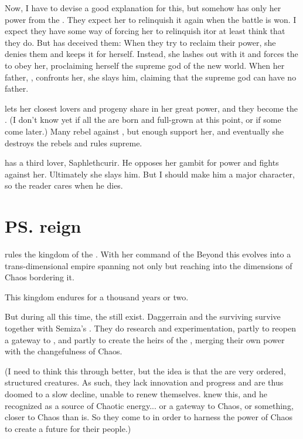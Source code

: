 Now, I have to devise a good explanation for this, but somehow \Xserasshana{} has only  her power from the \dragons{}. They expect her to relinquish it again when the battle is won. I expect they have some way of forcing her to relinquish it\dash or at least think that they do. But \Xserasshana{} has deceived them: When they try to reclaim their power, she denies them and keeps it for herself. Instead, she lashes out with it and forces the \dragons{} to obey her, proclaiming herself the supreme god of the new world. When her father, \HesodN, confronts her, she slays him, claiming that the supreme god can have no father. 

\Xserasshana{} lets her closest lovers and progeny share in her great power, and they become the \Dominators. (I don't know yet if all the \Dominators{} are born and full-grown at this point, or if some come later.) 
Many \dragons{} rebel against \Xserasshana{}, but enough support her, and eventually she destroys the rebels and rules supreme. 

\Xserasshana{} has a third lover, Saphlethcurir. He opposes her gambit for power and fights against her. Ultimately she slays him. But I should make him a major character, so the reader cares when he dies. 







\section{\ps{\Xserasshana}{} reign}
\Xserasshana{} rules the kingdom of the \dragons{}. With her command of the Beyond this evolves into a trans-dimensional empire spanning not only \Miith{} but reaching into the dimensions of Chaos bordering it. 

This kingdom endures for a thousand years or two. 

But during all this time, the \banes{} still exist. Daggerrain and the surviving \banelords{} survive together with Semiza's \nephilim. They do research and experimentation, partly to reopen a gateway to \Erebos{}, and partly to create the heirs of the \banes{}, merging their own \erebean{} power with the changefulness of Chaos. 

(I need to think this through better, but the idea is that the \banes{} are very ordered, structured creatures. As such, they lack innovation and progress and are thus doomed to a slow decline, unable to renew themselves. \Voidbringer{} knew this, and he recognized \Miith{} as a source of Chaotic energy... or a gateway to Chaos, or something, closer to Chaos than \Erebos{} is. So they come to \Miith{} in order to harness the power of Chaos to create a future for their people.)

